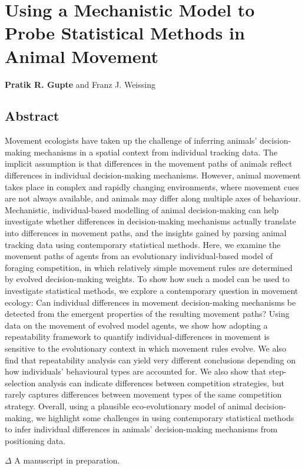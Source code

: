 
\chapter{Using a Mechanistic Model to Probe Statistical Methods in Animal Movement}\label{ch:patternprocess}

{\noindent \textbf{Pratik R. Gupte} and Franz J. Weissing}

\section*{Abstract}

\small{
    Movement ecologists have taken up the challenge of inferring animals' decision-making mechanisms in a spatial context from individual tracking data.
    The implicit assumption is that differences in the movement paths of animals reflect differences in individual decision-making mechanisms.
    However, animal movement takes place in complex and rapidly changing environments, where movement cues are not always available, and animals may differ along multiple axes of behaviour.
    Mechanistic, individual-based modelling of animal decision-making can help investigate whether differences in decision-making mechanisms actually translate into differences in movement paths, and the insights gained by parsing animal tracking data using contemporary statistical methods.
    Here, we examine the movement paths of agents from an evolutionary individual-based model of foraging competition, in which relatively simple movement rules are determined by evolved decision-making weights.
    To show how such a model can be used to investigate statistical methods, we explore a contemporary question in movement ecology: Can individual differences in movement decision-making mechanisms be detected from the emergent properties of the resulting movement paths?
    Using data on the movement of evolved model agents, we show how adopting a repeatability framework to quantify individual-differences in movement is sensitive to the evolutionary context in which movement rules evolve.
    We also find that repeatability analysis can yield very different conclusions depending on how individuals' behavioural types are accounted for.
    We also show that step-selection analysis can indicate differences between competition strategies, but rarely captures differences between movement types of the same competition strategy.
    Overall, using a plausible eco-evolutionary model of animal decision-making, we highlight some challenges in using contemporary statistical methods to infer individual differences in animals' decision-making mechanisms from positioning data.

    \bigskip

    {\noindent \large{$\Delta$}} A manuscript in preparation.
}

\clearpage

